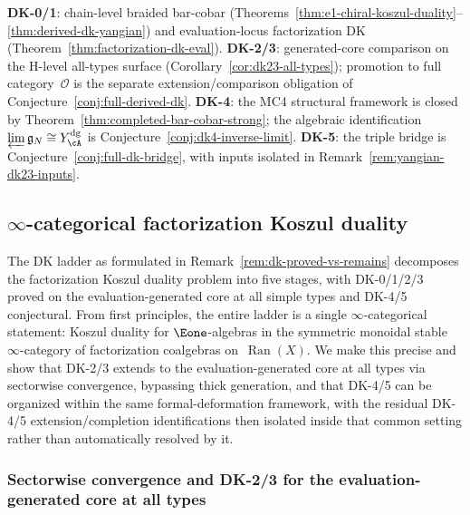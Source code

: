 \begin{remark}
\label{rem:dk-proved-vs-remains}
\textbf{DK-0/1}: chain-level braided bar-cobar
\textup{(}Theorems~\ref{thm:e1-chiral-koszul-duality}--\ref{thm:derived-dk-yangian}\textup{)}
and evaluation-locus factorization DK
\textup{(}Theorem~\ref{thm:factorization-dk-eval}\textup{)}.
\textbf{DK-2/3}: generated-core comparison on the H-level all-types
surface
\textup{(}Corollary~\ref{cor:dk23-all-types}\textup{)}; promotion to
full category~$\mathcal{O}$ is the separate extension/comparison
obligation of Conjecture~\ref{conj:full-derived-dk}.
\textbf{DK-4}: the MC4 structural framework is closed by
Theorem~\ref{thm:completed-bar-cobar-strong}; the algebraic
identification
$\varprojlim \mathfrak{g}_N \cong Y^{\mathrm{dg}}_\cA$ is
Conjecture~\ref{conj:dk4-inverse-limit}.
\textbf{DK-5}: the triple bridge is Conjecture~\ref{conj:full-dk-bridge},
with inputs isolated in Remark~\ref{rem:yangian-dk23-inputs}.
\end{remark}

\subsection{$\infty$-categorical factorization Koszul duality}
\label{sec:infty-cat-factorization-kd}

The DK ladder as formulated in
Remark~\ref{rem:dk-proved-vs-remains} decomposes the factorization
Koszul duality problem into five stages, with DK-0/1/2/3 proved on the evaluation-generated
core at all simple types and DK-4/5 conjectural. From first principles, the
entire ladder is a single $\infty$-categorical statement: Koszul
duality for $\Eone$-algebras in the symmetric monoidal stable
$\infty$-category of factorization coalgebras on~$\operatorname{Ran}(X)$.
We make this precise and show that DK-2/3 extends to the
evaluation-generated core at all types via
sectorwise convergence, bypassing thick generation, and that DK-4/5
can be organized within the same formal-deformation framework, with
the residual DK-4/5 extension/completion identifications
then isolated inside that common setting rather than
automatically resolved by it.

\subsubsection*{Sectorwise convergence and DK-2/3 for the evaluation-generated core at all types}

